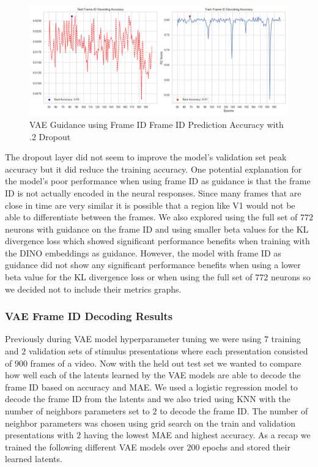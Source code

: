 \documentclass[12pt, letterpaper]{article}
\begin{document}
\begin{figure}[H]
    \centering
    \includegraphics[width=1.0\textwidth]{frame_id_accuracy_128dim_503_top_var_200_epochs_0.05_beta_2_layer_.2_dropout.png}
    \caption{VAE Guidance using Frame ID Frame ID Prediction Accuracy with .2 Dropout}
    \label{fig:vae_guidance_frame_id_accuracy_dropout}
\end{figure}

The dropout layer did not seem to improve the model's validation set peak accuracy but it did reduce the training accuracy. One potential explanation for the model's poor performance when using frame ID as guidance is that the frame ID is not actually encoded in the neural responses. Since many frames that are close in time are very similar it is possible that a region like V1 would not be able to differentiate between the frames. We also explored using the full set of $772$ neurons with guidance on the frame ID and using smaller beta values for the KL divergence loss which showed significant performance benefits when training with the DINO embeddings as guidance. However, the model with frame ID as guidance did not show any significant performance benefits when using a lower beta value for the KL divergence loss or when using the full set of $772$ neurons so we decided not to include their metrics graphs.

\subsubsection{VAE Frame ID Decoding Results}
\label{subsubsec:vae_frame_id_decoding}
Previously during VAE model hyperparameter tuning we were using $7$ training and $2$ validation sets of stimulus presentations where each presentation consisted of $900$ frames of a video. Now with the held out test set we wanted to compare how well each of the latents learned by the VAE models are able to decode the frame ID based on accuracy and MAE. We used a logistic regression model to decode the frame ID from the latents and we also tried using KNN with the number of neighbors parameters set to $2$ to decode the frame ID. The number of neighbor parameters was chosen using grid search on the train and validation presentations with $2$ having the lowest MAE and highest accuracy. As a recap we trained the following different VAE models over $200$ epochs and stored their learned latents.
\end{document}
